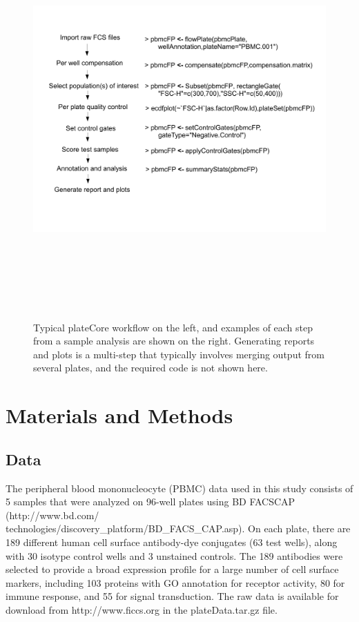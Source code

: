 \documentclass[12pt]{article}
\begin{document}
\begin{figure}
\centering
\includegraphics[width=7in,height=6in]{analysisSteps.pdf}
\caption{Typical plateCore workflow on the left, and examples of each step from a sample analysis are shown on the right.
Generating reports and plots is a multi-step that typically involves merging output from several plates, and the required
code is not shown here.}
\label{fig:analysis}
\end{figure}
 
\clearpage
\section*{Materials and Methods}
\subsection*{Data}

The peripheral blood mononucleocyte (PBMC) data used in this study consists of 5 samples that were analyzed on 96-well plates
using BD FACS\texttrademark CAP (http://www.bd.com/\\technologies/discovery\_platform/BD\_FACS\_CAP.asp).
On each plate, there are 189 different human cell surface antibody-dye conjugates (63 test wells), 
along with 30 isotype control wells and 3 unstained controls.
The 189 antibodies were selected to provide a broad expression profile
for a large number of cell surface markers, including 103 proteins with GO annotation for receptor activity, 80
for immune response, and 55 for signal transduction. The raw data is available for download from http://www.ficcs.org in the
plateData.tar.gz file. 
\end{document}
